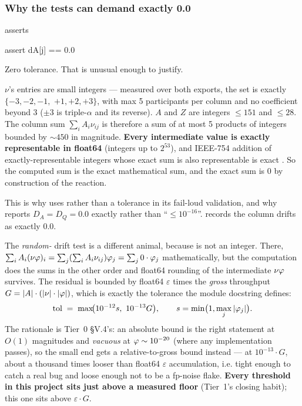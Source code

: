 \subsubsection{Why the tests can demand exactly 0.0}
\label{sec:exactzero}

asserts

\begin{srclisting}
assert dA[j] == 0.0
\end{srclisting}

Zero tolerance. That is unusual enough to justify.

$\nu$'s entries are small integers --- measured over both exports, the set is
exactly $\{-3, -2, -1,$ $+1, +2, +3\}$, with max 5 participants per column and no
coefficient beyond 3 ($\pm3$ is triple-$\alpha$ and its reverse). $A$ and $Z$
are integers $\le 151$ and $\le 28$. The column sum $\sum_i A_i\nu_{ij}$ is
therefore a sum of at most 5 products of integers bounded by ${\sim}450$ in
magnitude. \textbf{Every intermediate value is exactly representable in float64}
(integers up to $2^{53}$), and IEEE-754 addition of exactly-representable
integers whose exact sum is also representable is exact \citep{ieee754,
goldberg1991}. So the computed sum is the exact mathematical sum, and the exact
sum is 0 by construction of the reaction.

This is why  uses  rather than a tolerance in
its fail-loud validation, and why  reports
$D_A = D_Q = 0.0$ exactly rather than ``$\le 10^{-16}$''. 
records the column drifts as exactly 0.0.

The \emph{random-\netflux} drift test is a different animal, because \netflux{}
is not an integer. There, $\sum_i A_i(\nu\varphi)_i =
\sum_j (\sum_i A_i\nu_{ij})\varphi_j = \sum_j 0\cdot\varphi_j$ mathematically,
but the computation does the sums in the other order and float64 rounding of the
intermediate $\nu\varphi$ survives. The residual is bounded by float64
$\varepsilon$ times the \emph{gross} throughput
$G = |A|\cdot(|\nu|\cdot|\varphi|)$, which is exactly the tolerance the module
docstring defines:
%
\begin{equation}
\text{tol} \;=\; \max\!\bigl(10^{-12} s,\ 10^{-13} G\bigr),
\qquad s = \min\bigl(1, \max_j|\varphi_j|\bigr).
\label{eq:drifttol}
\end{equation}
%
The rationale is Tier~0 \S V.4's: an absolute bound is the right statement at
$O(1)$ magnitudes and \emph{vacuous} at $\varphi \sim 10^{-20}$ (where any
implementation passes), so the small end gets a relative-to-gross bound instead
--- at $10^{-13}\cdot G$, about a thousand times looser than float64
$\varepsilon$ accumulation, i.e. tight enough to catch a real bug and loose
enough not to be a fp-noise flake. \textbf{Every threshold in this project sits
just above a measured floor} (Tier~1's closing habit); this one sits above
$\varepsilon\cdot G$.

